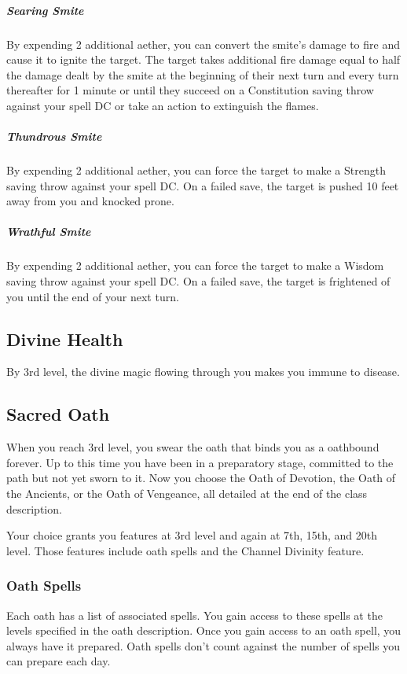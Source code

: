 \subparagraph*{Searing Smite} By expending 2 additional aether, you can convert the smite's damage to fire and cause it to ignite the target. The target takes additional fire damage equal to half the damage dealt by the smite at the beginning of their next turn and every turn thereafter for 1 minute or until they succeed on a Constitution saving throw against your spell DC or take an action to extinguish the flames.

\subparagraph*{Thundrous Smite} By expending 2 additional aether, you can force the target to make a Strength saving throw against your spell DC. On a failed save, the target is pushed 10 feet away from you and knocked prone.

\subparagraph*{Wrathful Smite} By expending 2 additional aether, you can force the target to make a Wisdom saving throw against your spell DC. On a failed save, the target is frightened of you until the end of your next turn.

\subsection{Divine Health}

By 3rd level, the divine magic flowing through you makes you immune to disease.

\subsection{Sacred Oath}

When you reach 3rd level, you swear the oath that binds you as a oathbound forever. Up to this time you have been in a preparatory stage, committed to the path but not yet sworn to it. Now you choose the Oath of Devotion, the Oath of the Ancients, or the Oath of Vengeance, all detailed at the end of the class description.

Your choice grants you features at 3rd level and again at 7th, 15th, and 20th level. Those features include oath spells and the Channel Divinity feature.

\subsubsection{Oath Spells}

Each oath has a list of associated spells. You gain access to these spells at the levels specified in the oath description. Once you gain access to an oath spell, you always have it prepared. Oath spells don't count against the number of spells you can prepare each day.

